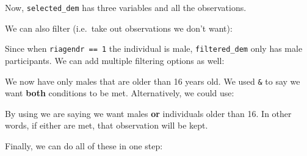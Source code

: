 \documentclass[]{tufte-book}
\newenvironment{Shaded}{}{}
\newcommand{\KeywordTok}[1]{\textcolor[rgb]{0.00,0.44,0.13}{\textbf{#1}}}
\newcommand{\DecValTok}[1]{\textcolor[rgb]{0.25,0.63,0.44}{#1}}
\newcommand{\StringTok}[1]{\textcolor[rgb]{0.25,0.44,0.63}{#1}}
\newcommand{\OperatorTok}[1]{\textcolor[rgb]{0.40,0.40,0.40}{#1}}
\newcommand{\NormalTok}[1]{#1}
\theoremstyle{definition}
\theoremstyle{definition}
\theoremstyle{remark}
\begin{document}
Now, \texttt{selected\_dem} has three variables and all the
observations.

We can also filter (i.e.~take out observations we don't want):

\begin{Shaded}
\end{Shaded}

Since when \texttt{riagendr\ ==\ 1} the individual is male,
\texttt{filtered\_dem} only has male participants. We can add multiple
filtering options as well:

\begin{Shaded}
\end{Shaded}

We now have only males that are older than 16 years old. We used
\texttt{\&} to say we want \textbf{both} conditions to be met.
Alternatively, we could use:

\begin{Shaded}
\end{Shaded}

By using \texttt{\textbar{}} we are saying we want males \textbf{or}
individuals older than 16. In other words, if either are met, that
observation will be kept.

Finally, we can do all of these in one step:

\begin{Shaded}
\end{Shaded}
\end{document}
